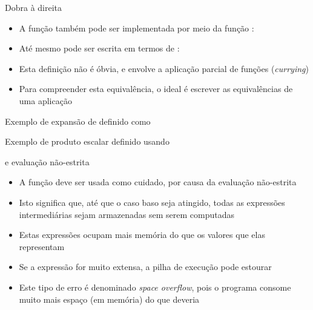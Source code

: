 \begin{frame}[fragile]{Dobra à direita}

    \begin{itemize}
        \item A função  também pode ser implementada por meio da função
            :


        \item Até mesmo  pode ser escrita em termos de :


        \item Esta definição não é óbvia, e envolve a aplicação parcial de funções 
            (\textit{currying})

        \item Para compreender esta equivalência, o ideal é escrever as equivalências de uma
            aplicação
    \end{itemize}

\end{frame}

\begin{frame}[fragile]{Exemplo de expansão de  definido como 
}
\end{frame}

\begin{frame}[fragile]{Exemplo de produto escalar definido usando }
\end{frame}

\begin{frame}[fragile]{ e evaluação não-estrita}

    \begin{itemize}
        \item A função  deve ser usada como cuidado, por causa da evaluação
            não-estrita

        \item Isto significa que, até que o caso baso seja atingido, todas as expressões
            intermediárias sejam armazenadas sem serem computadas
        
        \item Estas expressões ocupam mais memória do que os valores que elas representam

        \item Se a expressão for muito extensa, a pilha de execução pode estourar


        \item Este tipo de erro é denominado \textit{space overflow}, pois o programa consome
            muito mais espaço (em memória) do que deveria

    \end{itemize}

\end{frame}
